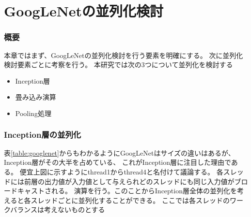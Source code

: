 \chapter{GoogLeNetの並列化検討}
{
\label{chap:parallel}

\subsection{概要}
本章ではまず、GoogLeNetの並列化検討を行う要素を明確にする。
次に並列化検討要素ごとに考察を行う。
本研究では次の3つについて並列化を検討する
\begin{itemize}
   \item Inception層 
   \item 畳み込み演算 
   \item Pooling処理 
\end{itemize}
\subsection{Inception層の並列化}
\label{sec:inception_para}
表\ref{table:googlenet}からもわかるようにGoogLeNetはサイズの違いはあるが、Inception層がその大半を占めている、
これがInception層に注目した理由である。
便宜上図に示すようにthread1からthread4と名付けて議論する。
各スレッドには前層の出力値が入力値として与えられどのスレッドにも同じ入力値がブロードキャストされる。
演算を行う。このことからInception層全体の並列化を考えると各スレッドごとに並列化することができる。
ここでは各スレッドのワークバランスは考えないものとする

}
